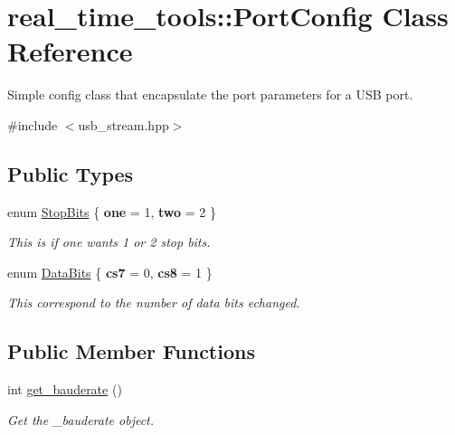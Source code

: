 \hypertarget{classreal__time__tools_1_1PortConfig}{}\section{real\+\_\+time\+\_\+tools\+:\+:Port\+Config Class Reference}
\label{classreal__time__tools_1_1PortConfig}


Simple config class that encapsulate the port parameters for a U\+SB port.  




{\ttfamily \#include $<$usb\+\_\+stream.\+hpp$>$}

\subsection*{Public Types}
\begin{DoxyCompactItemize}
\item 
enum \hyperlink{classreal__time__tools_1_1PortConfig_a62bbab15705e2d5a9bc17115222f7c07}{Stop\+Bits} \{ {\bfseries one} = 1, 
{\bfseries two} = 2
 \}\hypertarget{classreal__time__tools_1_1PortConfig_a62bbab15705e2d5a9bc17115222f7c07}{}\label{classreal__time__tools_1_1PortConfig_a62bbab15705e2d5a9bc17115222f7c07}
\begin{DoxyCompactList}\small\item\em This is if one wants 1 or 2 stop bits. \end{DoxyCompactList}
\item 
enum \hyperlink{classreal__time__tools_1_1PortConfig_a11e818aa26cd0a941ff00b9ccd4d2131}{Data\+Bits} \{ {\bfseries cs7} = 0, 
{\bfseries cs8} = 1
 \}\hypertarget{classreal__time__tools_1_1PortConfig_a11e818aa26cd0a941ff00b9ccd4d2131}{}\label{classreal__time__tools_1_1PortConfig_a11e818aa26cd0a941ff00b9ccd4d2131}
\begin{DoxyCompactList}\small\item\em This correspond to the number of data bits echanged. \end{DoxyCompactList}
\end{DoxyCompactItemize}
\subsection*{Public Member Functions}
\begin{DoxyCompactItemize}
\item 
int \hyperlink{classreal__time__tools_1_1PortConfig_a9dc2941d278825ecc20a5f260a7fb076}{get\+\_\+bauderate} ()
\begin{DoxyCompactList}\small\item\em Get the \+\_\+bauderate object. \end{DoxyCompactList}\end{DoxyCompactItemize}
